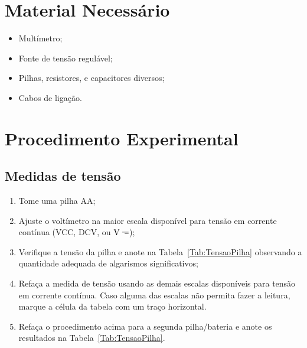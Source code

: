 \section{Material Necessário}

\begin{itemize}
	\item Multímetro;
	\item Fonte de tensão regulável;
	\item Pilhas, resistores, e capacitores diversos;
	\item Cabos de ligação.
\end{itemize}

\section{Procedimento Experimental}

\subsection{Medidas de tensão} %
\begin{enumerate}
	\item Tome uma pilha AA;
	\item Ajuste o voltímetro na maior escala disponível para tensão em corrente contínua (VCC, DCV, ou $\rm{V}\mathdirectcurrent$);
	\item Verifique a tensão da pilha e anote na Tabela~\ref{Tab:TensaoPilha} observando a quantidade adequada de algarismos significativos;
	\item Refaça a medida de tensão usando as demais escalas disponíveis para tensão em corrente contínua. Caso alguma das escalas não permita fazer a leitura, marque a célula da tabela com um traço horizontal.
	\item Refaça o procedimento acima para a segunda pilha/bateria e anote os resultados na Tabela~\ref{Tab:TensaoPilha}.
\end{enumerate}

\cleardoublepage

